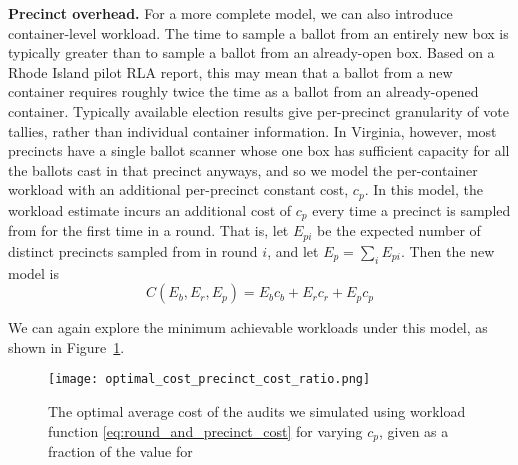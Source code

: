 \noindent\textbf{Precinct overhead.} For a more complete model, we can also introduce container-level workload. The time to sample a ballot from an entirely new box is typically greater than to sample a ballot from an already-open box. Based on a Rhode Island pilot RLA report\cite{RI-report}, this may mean that a ballot from a new container requires roughly twice the time as a ballot from an already-opened container. Typically available election results give per-precinct granularity of vote tallies, rather than individual container information. In Virginia, however, most precincts have a single ballot scanner whose one box has sufficient capacity for all the ballots cast in that precinct anyways, and so we model the per-container workload with an additional per-precinct constant cost, $c_p$. In this model, the workload estimate incurs an additional cost of $c_p$ every time a precinct is sampled from for the first time in a round. That is, let $E_{pi}$ be the expected number of distinct precincts sampled from in round $i$, and let $E_p=\sum_i E_{pi}$. Then the new model is
\begin{equation}
C(E_b, E_r, E_p) = E_b c_b + E_r c_r + E_p c_p
\label{eq:round_and_precinct_cost}
\end{equation}

We can again explore the minimum achievable workloads under this model, as shown in Figure~\ref{fig:optimal_cost_precinct_cost_ratio}.

\begin{figure}
\texttt{[image: optimal\_cost\_precinct\_cost\_ratio.png]}
\caption{The optimal average cost of the audits we simulated using workload function \ref{eq:round_and_precinct_cost} for varying $c_p$, given as a fraction of the value for \Providence}
\label{fig:optimal_cost_precinct_cost_ratio}
\end{figure}


